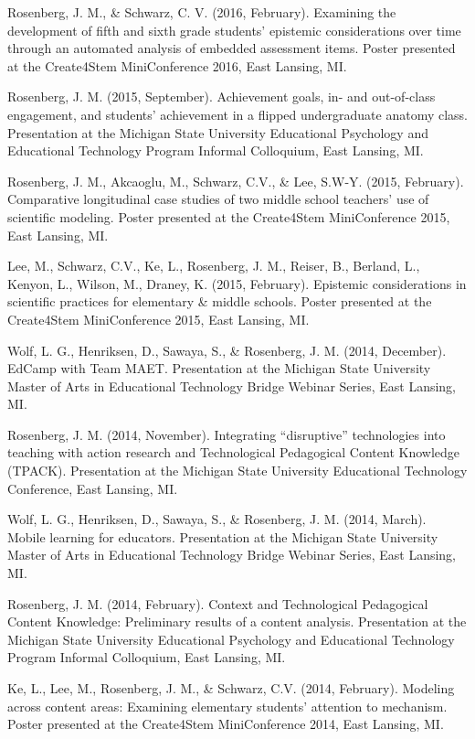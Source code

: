 \documentclass[14,]{article}
\begin{document}
Rosenberg, J. M., \& Schwarz, C. V. (2016, February). Examining the
development of fifth and sixth grade students' epistemic considerations
over time through an automated analysis of embedded assessment items.
Poster presented at the Create4Stem MiniConference 2016, East Lansing,
MI.

Rosenberg, J. M. (2015, September). Achievement goals, in- and
out-of-class engagement, and students' achievement in a flipped
undergraduate anatomy class. Presentation at the Michigan State
University Educational Psychology and Educational Technology Program
Informal Colloquium, East Lansing, MI.

Rosenberg, J. M., Akcaoglu, M., Schwarz, C.V., \& Lee, S.W-Y. (2015,
February). Comparative longitudinal case studies of two middle school
teachers' use of scientific modeling. Poster presented at the
Create4Stem MiniConference 2015, East Lansing, MI.

Lee, M., Schwarz, C.V., Ke, L., Rosenberg, J. M., Reiser, B., Berland,
L., Kenyon, L., Wilson, M., Draney, K. (2015, February). Epistemic
considerations in scientific practices for elementary \& middle schools.
Poster presented at the Create4Stem MiniConference 2015, East Lansing,
MI.

Wolf, L. G., Henriksen, D., Sawaya, S., \& Rosenberg, J. M. (2014,
December). EdCamp with Team MAET. Presentation at the Michigan State
University Master of Arts in Educational Technology Bridge Webinar
Series, East Lansing, MI.

Rosenberg, J. M. (2014, November). Integrating ``disruptive''
technologies into teaching with action research and Technological
Pedagogical Content Knowledge (TPACK). Presentation at the Michigan
State University Educational Technology Conference, East Lansing, MI.

Wolf, L. G., Henriksen, D., Sawaya, S., \& Rosenberg, J. M. (2014,
March). Mobile learning for educators. Presentation at the Michigan
State University Master of Arts in Educational Technology Bridge Webinar
Series, East Lansing, MI.

Rosenberg, J. M. (2014, February). Context and Technological Pedagogical
Content Knowledge: Preliminary results of a content analysis.
Presentation at the Michigan State University Educational Psychology and
Educational Technology Program Informal Colloquium, East Lansing, MI.

Ke, L., Lee, M., Rosenberg, J. M., \& Schwarz, C.V. (2014, February).
Modeling across content areas: Examining elementary students' attention
to mechanism. Poster presented at the Create4Stem MiniConference 2014,
East Lansing, MI.
\end{document}
